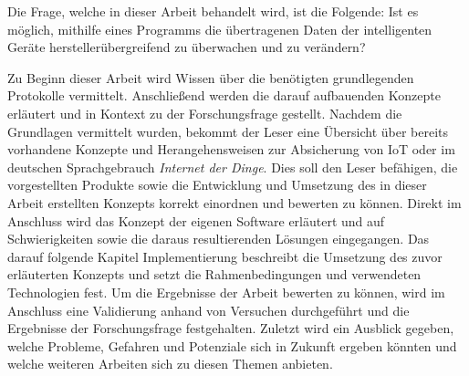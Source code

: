     Die Frage, welche in dieser Arbeit behandelt wird, ist die Folgende: 
    Ist es möglich, mithilfe eines Programms die übertragenen Daten der intelligenten Geräte herstellerübergreifend zu überwachen und zu verändern?

    Zu Beginn dieser Arbeit wird Wissen über die benötigten grundlegenden Protokolle vermittelt.
    Anschließend werden die darauf aufbauenden Konzepte erläutert und in Kontext zu der Forschungsfrage gestellt.
    Nachdem die Grundlagen vermittelt wurden, bekommt der Leser eine Übersicht über bereits vorhandene Konzepte und Herangehensweisen zur Absicherung von \ac{IoT} oder im deutschen Sprachgebrauch \emph{Internet der Dinge}. 
    Dies soll den Leser befähigen, die vorgestellten Produkte sowie die Entwicklung und Umsetzung des in dieser Arbeit erstellten Konzepts korrekt einordnen und bewerten zu können.
    Direkt im Anschluss wird das Konzept der eigenen Software erläutert und auf Schwierigkeiten sowie die daraus resultierenden Lösungen eingegangen. Das darauf folgende Kapitel \glqq Implementierung\grqq{} beschreibt die Umsetzung des zuvor erläuterten Konzepts und setzt die Rahmenbedingungen und verwendeten Technologien fest. Um die Ergebnisse der Arbeit bewerten zu können, wird im Anschluss eine Validierung anhand von Versuchen durchgeführt und die Ergebnisse der Forschungsfrage festgehalten. Zuletzt wird ein Ausblick gegeben, welche Probleme, Gefahren und Potenziale sich in Zukunft ergeben könnten und welche weiteren Arbeiten sich zu diesen Themen anbieten.
